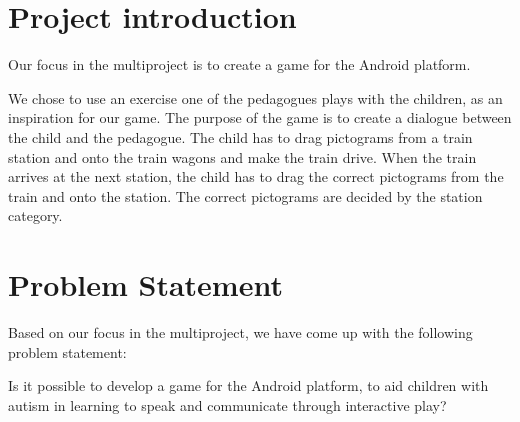 \section*{Project introduction}

Our focus in the multiproject is to create a game for the Android platform. 

We chose to use an exercise one of the pedagogues plays with the children, as an inspiration for our game. The purpose of the game is to create a dialogue between the child and the pedagogue. The child has to drag pictograms from a train station and onto the train wagons and make the train drive. When the train arrives at the next station, the child has to drag the correct pictograms from the train and onto the station. The correct pictograms are decided by the station category.

\section*{Problem Statement}

Based on our focus in the multiproject, we have come up with the following problem statement:

Is it possible to develop a game for the Android platform, to aid children with autism in learning to speak and communicate through interactive play?